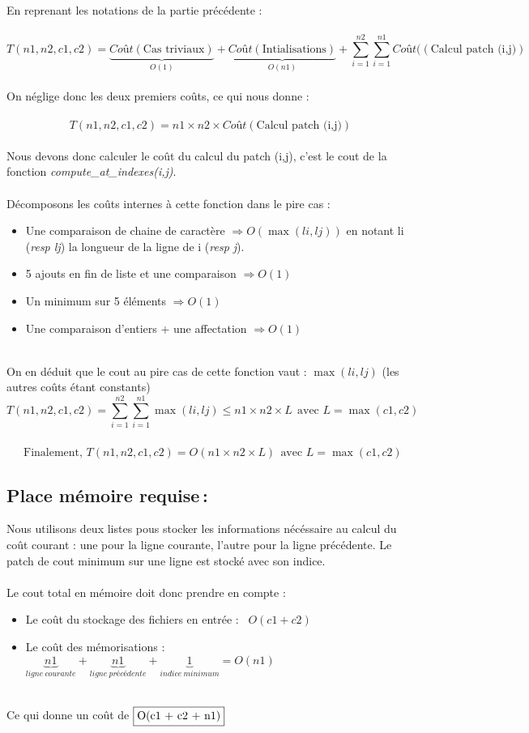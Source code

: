 \documentclass[a4paper, 10pt, french]{article}
\begin{document}
    En reprenant les notations de la partie précédente : \\ \\
    $$T(n1,n2,c1,c2) = \underbrace{Coût(\text{Cas triviaux})}_{O(1)} + 
    \underbrace{Coût(\text{Intialisations})}_{O(n1)} + 
    \sum_{i=1}^{n2} \sum_{i=1}^{n1} Coût((\text{Calcul patch (i,j)})$$ \\
	On néglige donc les deux premiers coûts, ce qui nous donne : \\ \\
	$$T(n1,n2,c1,c2) = n1 \times n2 \times Coût(\text{Calcul patch (i,j)})$$
	\\ 
	Nous devons donc calculer le coût du calcul du patch (i,j), c'est le cout de la fonction \emph{compute\_at\_indexes(i,j)}.\\ \\
	Décomposons les coûts internes à cette fonction dans le pire cas :
	\begin{itemize}
	\item Une comparaison de chaine de caractère $\Rightarrow  O(\max(li,lj))$ en notant li (\textit{resp lj}) la longueur de la ligne de i (\textit{resp j}).
	\item 5 ajouts en fin de liste et une comparaison $\Rightarrow O(1)$
	\item Un minimum sur 5 éléments $\Rightarrow O(1)$
	\item Une comparaison d'entiers + une affectation $\Rightarrow O(1)$
	\end{itemize}
	~\\
	On en déduit que le cout au pire cas de cette fonction vaut : $\max(li,lj)$ (les autres coûts étant constants)
	\\ 
	$$T(n1,n2,c1,c2) = \sum_{i=1}^{n2} \sum_{i=1}^{n1} \max(li,lj) \leq n1 \times n2 \times L \ \ \text{avec } L = \max(c1,c2)$$
	\\
	 \ \ \ $\text{Finalement, } T(n1,n2,c1,c2) = O(n1 \times n2 \times L)\ \ \text{avec } L = \max(c1,c2) $
  \subsection{Place mémoire requise\,: }
    Nous utilisons deux listes pous stocker les informations nécéssaire au calcul du coût courant : une pour la ligne courante, l'autre pour la ligne
    précédente. Le patch de cout minimum sur une ligne est stocké avec son indice.\\ \\
    Le cout total en mémoire doit donc prendre en compte : 
    \begin{itemize}
    \item Le coût du stockage des fichiers en entrée : \ $O(c1 + c2)$
    \item Le coût des mémorisations :  $\underbrace{n1}_{ligne\ courante} + \underbrace{n1}_{ligne\ précédente} + \underbrace{1}_{indice \ minimum} = O(n1)$
    \end{itemize}
    ~\\
    Ce qui donne un coût de $\fbox{O(c1 + c2 + n1)}$
\end{document}
